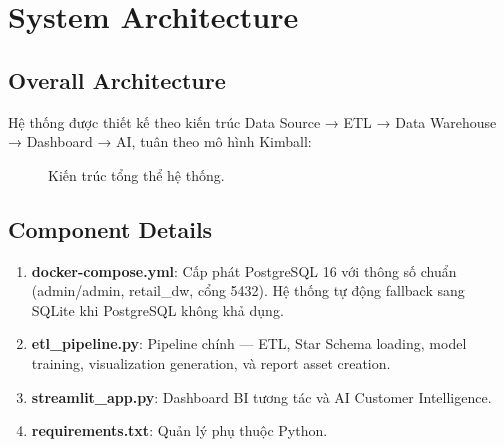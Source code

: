 \documentclass[a4paper,12pt]{article}
\begin{document}
\section{System Architecture}

\subsection{Overall Architecture}
Hệ thống được thiết kế theo kiến trúc Data Source → ETL → Data Warehouse → Dashboard → AI, tuân theo mô hình Kimball:

\begin{figure}[H]
\centering
{}
\caption{Kiến trúc tổng thể hệ thống.}
\end{figure}

\subsection{Component Details}
\begin{enumerate}
    \item \textbf{docker-compose.yml}: Cấp phát PostgreSQL 16 với thông số chuẩn (admin/admin, retail\_dw, cổng 5432). Hệ thống tự động fallback sang SQLite khi PostgreSQL không khả dụng.
    \item \textbf{etl\_pipeline.py}: Pipeline chính — ETL, Star Schema loading, model training, visualization generation, và report asset creation.
    \item \textbf{streamlit\_app.py}: Dashboard BI tương tác và AI Customer Intelligence.
    \item \textbf{requirements.txt}: Quản lý phụ thuộc Python.
\end{enumerate}
\end{document}
